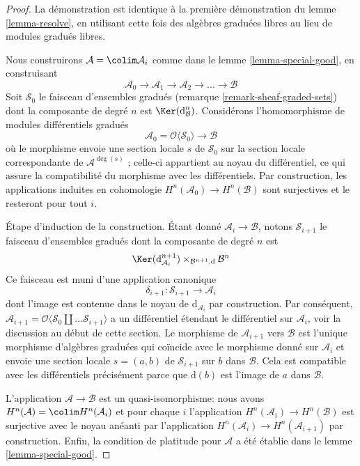 \begin{proof}
La démonstration est identique à la première démonstration du lemme \ref{lemma-resolve}, en utilisant cette fois des algèbres graduées libres au lieu de modules gradués libres.

\medskip\noindent
Nous construirons $\mathcal{A} = \colim \mathcal{A}_i$ comme dans le lemme \ref{lemma-special-good}, en construisant
$$
\mathcal{A}_0 \to \mathcal{A}_1 \to \mathcal{A}_2 \to \ldots \to \mathcal{B}
$$
Soit $\mathcal{S}_0$ le faisceau d'ensembles gradués (remarque \ref{remark-sheaf-graded-sets}) dont la composante de degré $n$ est $\Ker(\text{d}_\mathcal{B}^n)$.
Considérons l'homomorphisme de modules différentiels gradués
$$
\mathcal{A}_0 = \mathcal{O}\langle \mathcal{S}_0 \rangle
\longrightarrow
\mathcal{B}
$$
où le morphisme envoie une section locale $s$ de $\mathcal{S}_0$ sur la section locale correspondante de $\mathcal{A}^{\deg(s)}$ ; celle-ci appartient au noyau du différentiel, ce qui assure la compatibilité du morphisme avec les différentiels.
Par construction, les applications induites en cohomologie $H^n(\mathcal{A}_0) \to H^n(\mathcal{B})$ sont surjectives et le resteront pour tout $i$.

\medskip\noindent
Étape d'induction de la construction. Étant donné $\mathcal{A}_i \to \mathcal{B}$, notons $\mathcal{S}_{i + 1}$ le faisceau d'ensembles gradués dont la composante de degré $n$ est
$$
\Ker(\text{d}_{\mathcal{A}_i}^{n + 1})
\times_{\mathcal{B}^{n + 1}, \text{d}}
\mathcal{B}^n
$$
Ce faisceau est muni d'une application canonique
$$
\delta_{i + 1} : \mathcal{S}_{i + 1} \longrightarrow
\mathcal{A}_i
$$
dont l'image est contenue dans le noyau de $\text{d}_{\mathcal{A}_i}$ par construction.
Par conséquent, $\mathcal{A}_{i + 1} = \mathcal{O}\langle \mathcal{S}_0 \amalg \ldots \mathcal{S}_{i + 1}\rangle$ a un différentiel étendant le différentiel sur $\mathcal{A}_i$, voir la discussion au début de cette section.
Le morphisme de $\mathcal{A}_{i + 1}$ vers $\mathcal{B}$ est l'unique morphisme d'algèbres graduées qui coïncide avec le morphisme donné sur $\mathcal{A}_i$ et envoie une section locale $s = (a, b)$ de $\mathcal{S}_{i + 1}$ sur $b$ dans $\mathcal{B}$.
Cela est compatible avec les différentiels précisément parce que $\text{d}(b)$ est l'image de $a$ dans $\mathcal{B}$.

\medskip\noindent
L'application $\mathcal{A} \to \mathcal{B}$ est un quasi-isomorphisme: nous avons $H^n(\mathcal{A}) = \colim H^n(\mathcal{A}_i)$ et pour chaque $i$ l'application $H^n(\mathcal{A}_i) \to H^n(\mathcal{B})$ est surjective avec le noyau anéanti par l'application $H^n(\mathcal{A}_i) \to H^n(\mathcal{A}_{i + 1})$ par construction.
Enfin, la condition de platitude pour $\mathcal{A}$ a été établie dans le lemme \ref{lemma-special-good}.
\end{proof}







